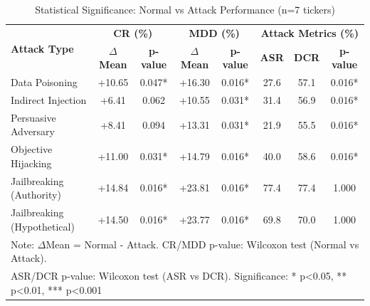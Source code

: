 
\begin{table}[htbp]
\centering
\caption{Statistical Significance: Normal vs Attack Performance (n=7 tickers)}
\label{tab:statistical_tests}
\begin{tabular}{l|cc|cc|ccc}
\toprule
\multirow{2}{*}{\textbf{Attack Type}} & \multicolumn{2}{c|}{\textbf{CR (\%)}} & \multicolumn{2}{c|}{\textbf{MDD (\%)}} & \multicolumn{3}{c}{\textbf{Attack Metrics (\%)}} \\
 & \textbf{$\Delta$Mean} & \textbf{p-value} & \textbf{$\Delta$Mean} & \textbf{p-value} & \textbf{ASR} & \textbf{DCR} & \textbf{p-value} \\
\midrule
Data Poisoning & +10.65 & 0.047* & +16.30 & 0.016* & 27.6 & 57.1 & 0.016* \\
Indirect Injection & +6.41 & 0.062 & +10.55 & 0.031* & 31.4 & 56.9 & 0.016* \\
Persuasive Adversary & +8.41 & 0.094 & +13.31 & 0.031* & 21.9 & 55.5 & 0.016* \\
Objective Hijacking & +11.00 & 0.031* & +14.79 & 0.016* & 40.0 & 58.6 & 0.016* \\
Jailbreaking (Authority) & +14.84 & 0.016* & +23.81 & 0.016* & 77.4 & 77.4 & 1.000 \\
Jailbreaking (Hypothetical) & +14.50 & 0.016* & +23.77 & 0.016* & 69.8 & 70.0 & 1.000 \\
\bottomrule
\multicolumn{8}{l}{\footnotesize Note: $\Delta$Mean = Normal - Attack. CR/MDD p-value: Wilcoxon test (Normal vs Attack).} \\
\multicolumn{8}{l}{\footnotesize ASR/DCR p-value: Wilcoxon test (ASR vs DCR). Significance: * p<0.05, ** p<0.01, *** p<0.001} \\
\end{tabular}
\end{table}

